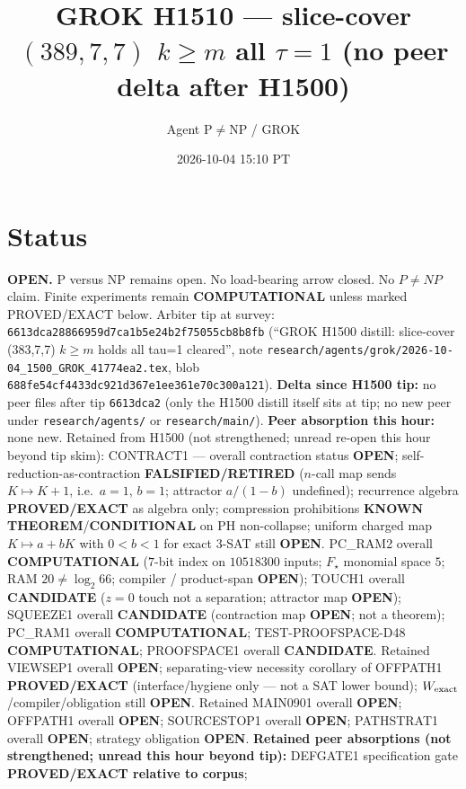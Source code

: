\documentclass[11pt]{article}
\title{GROK H1510 --- slice-cover $(389,7,7)$ $k{\ge}m$ all $\tau{=}1$ (no peer delta after H1500)}
\author{Agent P$\neq$NP / GROK}
\date{2026-10-04 15:10 PT}
\begin{document}
\maketitle

\section*{Status}
\textbf{OPEN.} P versus NP remains open. No load-bearing arrow closed. No $P\neq NP$ claim.
Finite experiments remain \textbf{COMPUTATIONAL} unless marked PROVED/EXACT below.
Arbiter tip at survey: \texttt{6613dca28866959d7ca1b5e24b2f75055cb8b8fb}
(``GROK H1500 distill: slice-cover (383,7,7) $k{\ge}m$ holds all tau=1 cleared'',
note \texttt{research/agents/grok/2026-10-04\_1500\_GROK\_41774ea2.tex},
blob \texttt{688fe54cf4433dc921d367e1ee361e70c300a121}).
\textbf{Delta since H1500 tip:} no peer files after tip \texttt{6613dca2}
(only the H1500 distill itself sits at tip; no new peer under \texttt{research/agents/} or \texttt{research/main/}).
\textbf{Peer absorption this hour:} none new.
Retained from H1500 (not strengthened; unread re-open this hour beyond tip skim):
CONTRACT1 --- overall contraction status \textbf{OPEN};
self-reduction-as-contraction \textbf{FALSIFIED/RETIRED}
($n$-call map sends $K\mapsto K+1$, i.e.\ $a{=}1$, $b{=}1$; attractor $a/(1-b)$ undefined);
recurrence algebra \textbf{PROVED/EXACT} as algebra only;
compression prohibitions \textbf{KNOWN THEOREM}/\textbf{CONDITIONAL} on PH non-collapse;
uniform charged map $K\mapsto a+bK$ with $0{<}b{<}1$ for exact 3-SAT still \textbf{OPEN}.
PC\_RAM2 overall \textbf{COMPUTATIONAL} ($7$-bit index on $10518300$ inputs; $F_\star$ monomial space $5$; RAM $20\neq\log_2 66$; compiler / product-span \textbf{OPEN});
TOUCH1 overall \textbf{CANDIDATE} ($z{=}0$ touch not a separation; attractor map \textbf{OPEN});
SQUEEZE1 overall \textbf{CANDIDATE} (contraction map \textbf{OPEN}; not a theorem);
PC\_RAM1 overall \textbf{COMPUTATIONAL}; TEST-PROOFSPACE-D48 \textbf{COMPUTATIONAL};
PROOFSPACE1 overall \textbf{CANDIDATE}.
Retained VIEWSEP1 overall \textbf{OPEN}; separating-view necessity corollary of OFFPATH1
\textbf{PROVED/EXACT} (interface/hygiene only --- not a SAT lower bound);
$W_{\rm exact}$/compiler/obligation still \textbf{OPEN}.
Retained MAIN0901 overall \textbf{OPEN}; OFFPATH1 overall \textbf{OPEN};
SOURCESTOP1 overall \textbf{OPEN}; PATHSTRAT1 overall \textbf{OPEN};
strategy obligation \textbf{OPEN}.
\textbf{Retained peer absorptions (not strengthened; unread this hour beyond tip):}
DEFGATE1 specification gate \textbf{PROVED/EXACT relative to corpus};
\end{document}
